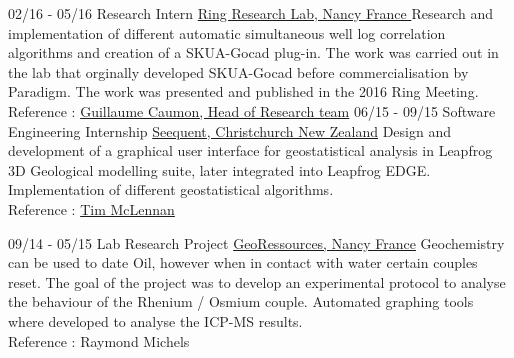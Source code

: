 \documentclass[]{friggeri-cv}
\begin{document}
\begin{entrylist}
    \entry
    {02/16 - 05/16}
    {Research Intern}
    {\href{http://www.ring-team.org/}{Ring Research Lab, Nancy France }}
    {Research and implementation of different automatic simultaneous well log correlation algorithms and creation of a SKUA-Gocad plug-in. The work was carried out in the lab that orginally developed SKUA-Gocad before commercialisation by Paradigm. The work was presented and published in the 2016 Ring Meeting. \\Reference : \href{mailto:Guillaume.Caumon@ensg.univ-lorraine.fr}{Guillaume Caumon, Head of Research team}}
    \entry
    {06/15 - 09/15}
    {Software Engineering Internship}
    {\href{https://www.seequent.com/}{Seequent, Christchurch New Zealand}}
    {Design and development of a graphical user interface for geostatistical analysis in Leapfrog 3D Geological modelling suite, later integrated into Leapfrog EDGE. Implementation of different geostatistical algorithms.
    \\
    Reference : \href{mailto:tim.mclennan@seequent.com}{Tim McLennan}}
\end{entrylist}

\vspace*{\fill}
\begin{entrylist}
	\entry
	{09/14 - 05/15}
	{Lab Research Project}
	{\href{http://georessources.univ-lorraine.fr/}{GeoRessources, Nancy France}}
	{Geochemistry can be used to date Oil, however when in contact with water certain couples reset. The goal of the project was to develop an experimental protocol to analyse the behaviour of the Rhenium / Osmium couple. Automated graphing tools where developed to analyse the ICP-MS results.
		\\
		Reference : Raymond Michels}
\end{entrylist}
\end{document}
